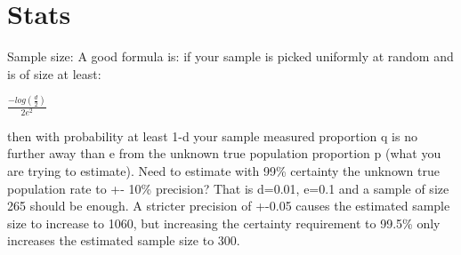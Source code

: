 \documentclass[]{book}
\theoremstyle{definition}
\theoremstyle{definition}
\theoremstyle{definition}
\theoremstyle{remark}
\begin{document}
\section{Stats}\label{stats}

Sample size: A good formula is: if your sample is picked uniformly at
random and is of size at least:

\(\frac{-log(\frac{d}{2})}{2e^2}\)

then with probability at least 1-d your sample measured proportion q is
no further away than e from the unknown true population proportion p
(what you are trying to estimate). Need to estimate with 99\% certainty
the unknown true population rate to +- 10\% precision? That is d=0.01,
e=0.1 and a sample of size 265 should be enough. A stricter precision of
+-0.05 causes the estimated sample size to increase to 1060, but
increasing the certainty requirement to 99.5\% only increases the
estimated sample size to 300.
\end{document}
